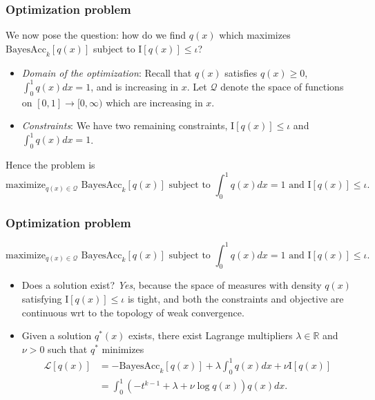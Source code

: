 \documentclass{beamer}
\begin{document}
\begin{frame}
\frametitle{Optimization problem}
We now pose the question: how do we find $q(x)$ which maximizes $\text{BayesAcc}_k[q(x)]$ subject to $\text{I}[q(x)] \leq \iota$?

\begin{itemize}
\item \emph{Domain of the optimization}: Recall that $q(x)$ satisfies $q(x) \geq 0$, $\int_0^1 q(x) dx = 1$, and is increasing in $x$.
Let $\mathcal{Q}$ denote the space of functions on $[0,1] \to [0,\infty)$ which are increasing in $x$.
\item \emph{Constraints}: We have two remaining constraints, $\text{I}[q(x)] \leq \iota$ and $\int_0^1 q(x) dx = 1$.
\end{itemize}

Hence the problem is
\[
\text{maximize}_{q(x) \in \mathcal{Q}}\text{ BayesAcc}_k[q(x)]\text{ subject to }\int_0^1 q(x) dx = 1\text{ and }\text{I}[q(x)] \leq \iota.
\]
\end{frame}


\begin{frame}
\frametitle{Optimization problem}
\[
\text{maximize}_{q(x) \in \mathcal{Q}}\text{ BayesAcc}_k[q(x)]\text{ subject to }\int_0^1 q(x) dx = 1\text{ and }\text{I}[q(x)] \leq \iota.
\]
\begin{itemize}
\item Does a solution exist? \emph{Yes}, because the space of measures
  with density $q(x)$ satisfying $\text{I}[q(x)] \leq \iota$ is tight,
  and both the constraints and objective are continuous wrt to the
  topology of weak convergence.
\item Given a solution $q^*(x)$ exists, there exist Lagrange multipliers $\lambda \in \mathbb{R}$ and $\nu > 0$ such that $q^*$ minimizes
\begin{align*}
\mathcal{L}[q(x)] &= -\text{BayesAcc}_k[q(x)] + \lambda \int_0^1 q(x) dx + \nu \text{I}[q(x)]
\\&= \int_0^1 (-t^{k-1} + \lambda + \nu \log q(x)) q(x) dx.
\end{align*}
\end{itemize}

\end{frame}
\end{document}
